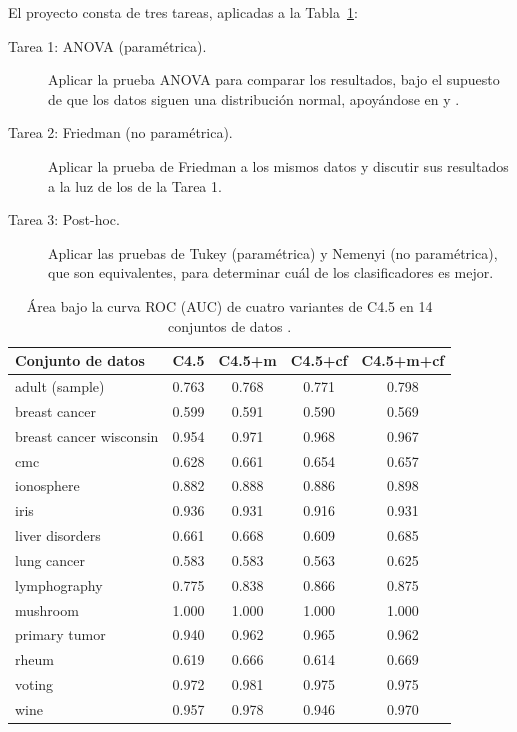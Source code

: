 \documentclass[11pt,letterpaper]{article}
\begin{document}
El proyecto consta de tres tareas, aplicadas a la Tabla~\ref{tab:datos}:

\begin{description}
    \item[Tarea 1: ANOVA (paramétrica).] Aplicar la prueba ANOVA para comparar los resultados, bajo el supuesto de que los datos siguen una distribución normal, apoyándose en \textcite{demsar2006} y \textcite{walpole2007}.
    \item[Tarea 2: Friedman (no paramétrica).] Aplicar la prueba de Friedman a los mismos datos y discutir sus resultados a la luz de los de la Tarea 1.
    \item[Tarea 3: Post-hoc.] Aplicar las pruebas de Tukey (paramétrica) y Nemenyi (no paramétrica), que son equivalentes, para determinar cuál de los clasificadores es mejor.
\end{description}

\begin{table}[htbp]
\centering
\caption{Área bajo la curva ROC (AUC) de cuatro variantes de C4.5 en 14 conjuntos de datos \parencite{demsar2006}.}
\label{tab:datos}
\small
\renewcommand{\arraystretch}{1.15}
\begin{tabular}{lcccc}
\hline
\textbf{Conjunto de datos} & \textbf{C4.5} & \textbf{C4.5+m} & \textbf{C4.5+cf} & \textbf{C4.5+m+cf} \\
\hline
adult (sample) & 0.763 & 0.768 & 0.771 & 0.798 \\
breast cancer & 0.599 & 0.591 & 0.590 & 0.569 \\
breast cancer wisconsin & 0.954 & 0.971 & 0.968 & 0.967 \\
cmc & 0.628 & 0.661 & 0.654 & 0.657 \\
ionosphere & 0.882 & 0.888 & 0.886 & 0.898 \\
iris & 0.936 & 0.931 & 0.916 & 0.931 \\
liver disorders & 0.661 & 0.668 & 0.609 & 0.685 \\
lung cancer & 0.583 & 0.583 & 0.563 & 0.625 \\
lymphography & 0.775 & 0.838 & 0.866 & 0.875 \\
mushroom & 1.000 & 1.000 & 1.000 & 1.000 \\
primary tumor & 0.940 & 0.962 & 0.965 & 0.962 \\
rheum & 0.619 & 0.666 & 0.614 & 0.669 \\
voting & 0.972 & 0.981 & 0.975 & 0.975 \\
wine & 0.957 & 0.978 & 0.946 & 0.970 \\
\hline
\end{tabular}
\end{table}
\end{document}
